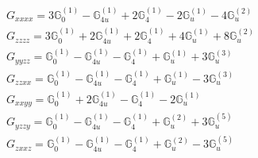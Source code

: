\documentclass[fleqn,8pt,landscape]{jsarticle}
\begin{document}
\begin{align*}
& G_{xxxx} = 3 \mathbb{G}_{0}^{(1)} - \mathbb{G}_{4u}^{(1)} + 2 \mathbb{G}_{4}^{(1)} - 2 \mathbb{G}_{u}^{(1)} - 4 \mathbb{G}_{u}^{(2)} \\
& G_{zzzz} = 3 \mathbb{G}_{0}^{(1)} + 2 \mathbb{G}_{4u}^{(1)} + 2 \mathbb{G}_{4}^{(1)} + 4 \mathbb{G}_{u}^{(1)} + 8 \mathbb{G}_{u}^{(2)} \\
& G_{yyzz} = \mathbb{G}_{0}^{(1)} - \mathbb{G}_{4u}^{(1)} - \mathbb{G}_{4}^{(1)} + \mathbb{G}_{u}^{(1)} + 3 \mathbb{G}_{u}^{(3)} \\
& G_{zzxx} = \mathbb{G}_{0}^{(1)} - \mathbb{G}_{4u}^{(1)} - \mathbb{G}_{4}^{(1)} + \mathbb{G}_{u}^{(1)} - 3 \mathbb{G}_{u}^{(3)} \\
& G_{xxyy} = \mathbb{G}_{0}^{(1)} + 2 \mathbb{G}_{4u}^{(1)} - \mathbb{G}_{4}^{(1)} - 2 \mathbb{G}_{u}^{(1)} \\
& G_{yzzy} = \mathbb{G}_{0}^{(1)} - \mathbb{G}_{4u}^{(1)} - \mathbb{G}_{4}^{(1)} + \mathbb{G}_{u}^{(2)} + 3 \mathbb{G}_{u}^{(5)} \\
& G_{zxxz} = \mathbb{G}_{0}^{(1)} - \mathbb{G}_{4u}^{(1)} - \mathbb{G}_{4}^{(1)} + \mathbb{G}_{u}^{(2)} - 3 \mathbb{G}_{u}^{(5)}
\end{align*}
\end{document}
